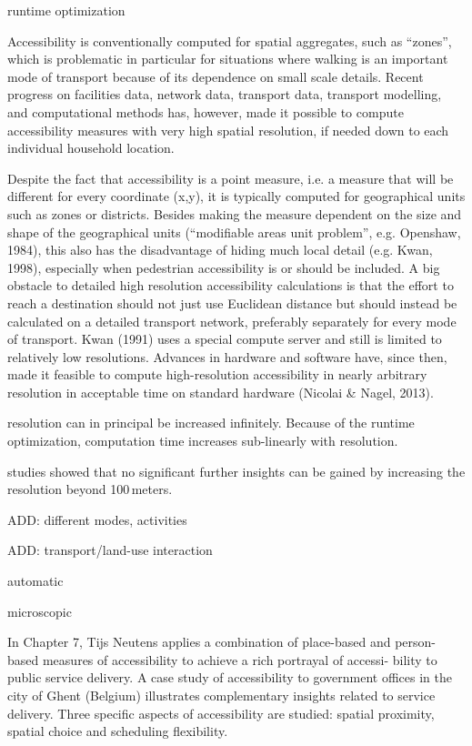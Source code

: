 runtime optimization
%
%
%
%
%


Accessibility is conventionally computed for spatial aggregates, such as “zones”, which is problematic in particular for situations where walking is an important mode of transport because of its dependence on small scale details. Recent progress on facilities data, network data, transport data, transport modelling, and computational methods has, however, made it possible to compute accessibility measures with very high spatial resolution, if needed down to each individual household location.

Despite the fact that accessibility is a point measure, i.e. a measure that will be different for every coordinate (x,y), it is typically computed for geographical units such as zones or districts. Besides making the measure dependent on the size and shape of the geographical units (“modifiable areas unit problem”, e.g. Openshaw, 1984), this also has the disadvantage of hiding much local detail (e.g. Kwan, 1998), especially when pedestrian accessibility is or should be included.
A big obstacle to detailed high resolution accessibility calculations is that the effort to reach a destination should not just use Euclidean distance but should instead be calculated on a detailed transport network, preferably separately for every mode of transport. Kwan (1991) uses a special compute server and still is limited to relatively low resolutions. Advances in hardware and software have, since then, made it feasible to compute high-resolution accessibility in nearly arbitrary resolution in acceptable time on standard hardware (Nicolai & Nagel, 2013).



resolution can in principal be increased infinitely. Because of the runtime optimization, computation time increases 
sub-linearly with resolution.

studies showed that no significant further insights can be gained by increasing the resolution beyond 100\,meters.

ADD: different modes, activities

ADD: transport/land-use interaction

automatic

microscopic




In Chapter 7, Tijs Neutens applies a combination of place-based and person-based measures of accessibility to achieve 
a rich portrayal of accessi- bility to public service delivery. A case study of accessibility to government offices 
in the city of Ghent (Belgium) illustrates complementary insights related to service delivery. Three specific aspects 
of accessibility are studied: spatial proximity, spatial choice and scheduling flexibility.

